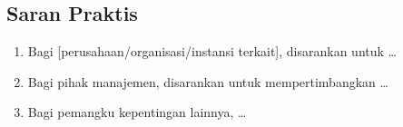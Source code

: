 \subsection{Saran Praktis}
\label{subsec:saran-praktis}

\begin{enumerate}
  \item Bagi [perusahaan/organisasi/instansi terkait], disarankan untuk \ldots

  \item Bagi pihak manajemen, disarankan untuk mempertimbangkan \ldots

  \item Bagi pemangku kepentingan lainnya, \ldots
\end{enumerate}
